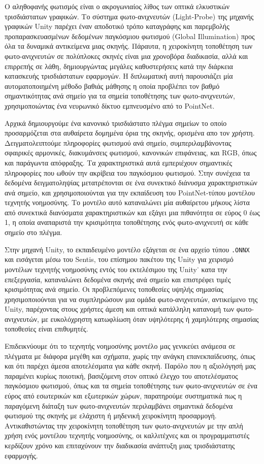 \gr Ο αληθοφανής φωτισμός είναι ο ακρογωνιαίος λίθος των οπτικά ελκυστικών τρισδιάστατων γραφικών. Το σύστημα φωτο-ανιχνευτών (\en Light-Probe) \gr της μηχανής γραφικών \en Unity \gr παρέχει έναν αποδοτικό τρόπο καταγράφης και παρεμβολής προπαρασκευασμένων δεδομένων παγκόσμιου φωτισμού (\en Global Illumination) \gr προς όλα τα δυναμικά αντικείμενα μιας σκηνής. Πάραυτα, η χειροκίνητη τοποθέτηση των  φωτο-ανιχνευτών σε πολύπλοκες σκηνές είναι μια χρονοβόρα διαδικασία, αλλά και επιρρεπής σε λάθη, δημιουργώντας μεγάλες καθυστερήσεις κατά την διάρκεια κατασκευής τρισδιάστατων εφαρμογών. Η διπλωματική αυτή παρουσιάζει μία αυτοματοποιημένη μέθοδο βαθιάς μάθησης η οποία προβλέπει τον βαθμό σημαντικότητας ανά σημείο για τα σημεία τοποθέτησης των φωτο-ανιχνευτών, χρησιμοποιώντας ένα νευρωνικό δίκτυο εμπνευσμένο από το \en PointNet.

\gr Αρχικά δημιουργούμε ένα κανονικό τρισδιάστατο πλέγμα σημείων το οποίο προσαρμόζεται στα αυθαίρετα δομημένα όρια της σκηνής, ορισμένα απο τον χρήστη. Δειγματολειπτούμε  πληροφορίες φωτισμού ανά σημείο, συμπεριλαμβάνοντας σφαιρικές αρμονικές, διακυμάνσεις φωτισμού, κανονικών επιφάνειας, και \en RGB, \gr όπως και παράγωντα απόφραξης. Τα χαρακτηριστικά αυτά εμπεριέχουν σημαντικές πληροφορίες που ωθούν την ακρίβεια του παγκόσμιου φωτισμού. Στην συνέχεια τα δεδομένα δειγματοληψίας μετατρέπονται σε ένα συνεκτικό διάνυσμα χαρακτηριστικών ανά σημείο, και χρησιμοποιούνται για την εκπαίδευση του \en PointNet-\gr τύπου μοντέλου τεχνητής νοημοσύνης. Το μοντέλο αυτό καταναλώνει μία αυθαίρετου μήκους λίστα από συνεκτικά διανύσματα χαρακτηριστικών και εξάγει μια πιθανότητα σε εύρος 0 έως 1, η οποία αναπαριστά την κρισιμότητα τοποθέτησης ενός  φωτο-ανιχνευτή σε κάθε σημείο στο πλέγμα.

\gr Στην μηχανή \en Unity, \gr το εκπαιδευμένο μοντέλο εξάγεται σε ένα αρχείο τύπου \en \verb*|.ONNX| \gr και εισάγεται μέσω του \en Sentis, \gr του επίσημου πακέτου της \en Unity \gr για χειρισμό μοντέλων τεχνητής νοημοσύνης εντός του εκτελέσιμου της \en Unity˙ \gr κατα την επεξεργασία, καταναλώνει δεδομένα σκηνής ανά σημείο και επιστρέφει τιμές κρισιμότητας ανά σημείο. Οι προβλεπόμενες τοποθεσίες υψηλής σημασίας χρησιμοποιούνται για να συμπληρώσουν μια ομάδα φωτο-ανιχνευτών, αντικείμενο της \en Unity, \gr παρέχοντας στους χρήστες άμεση και οπτικά κατάλληλη κατανομή των φωτο-ανιχνευτών, με ευκολόχρηστη κατωφλίωση όταν υψηλότερης ή χαμηλότερης σημασίας τοποθεσίες είναι επιθυμητές.

\gr Επιδεικνύουμε ότι το τεχνητής νοημοσύνης μοντέλο μας γενικεύει ανάμεσα σε πλέγματα με διάφορα μεγέθη και σχήματα, χωρίς την ανάγκη επανεκπαίδευσης, όπως και ότι παρέχει άμεσα αποτελέσματα για κάθε σκηνή. Παρόλο που η αξιολόγησή μας παραμένει κυρίως ποιοτική, βασιζόμενη στον οπτικό έλεγχο του αποτελέσματος παγκόσμιου φωτισμού, όπως και τα σημεία τοποθέτησης των φωτο-ανιχνευτών σε ένα εύρος από εσωτερικών και εξωτερικών χώρων, παρατηρούμε συστηματικά πως η παραγόμενη διάταξη των φωτο-ανιχνευτών περιλαμβάνει σημαντικά δεδομένα φωτισμού της σκηνής με ελάχιστη ή μηδενική χειροκίνητη προσαρμογή. Αντικαθιστώντας την χειροκίνητη τοποθέτηση των φωτο-ανιχνευτών με την απλή χρήση ενός μοντέλου τεχνητής νοημοσύνης, οι καλλιτέχνες και οι προγραμματιστές κερδίζουν χρόνο και επιταχύνουν την διαδικασία ανάπτυξη μιας τρισδιάστατης εφαρμογής.\en
